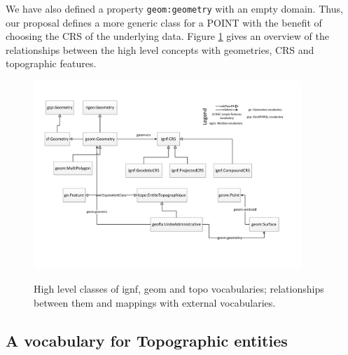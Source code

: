 We have also defined a property \texttt{geom:geometry} with an empty domain. Thus, our proposal defines a more generic class for a \textsf{POINT} with the benefit of choosing the CRS of the underlying data. Figure \ref{fig:geomcrs} gives an overview of the relationships between the high level concepts with geometries, CRS and topographic features.

\begin{figure}[!htbp]
\vspace{-13pt}
  \begin{center}
  \includegraphics[width=0.9\textwidth]{img/vocabs-ign.pdf}
  \vspace{-15pt}
  \caption{High level classes of ignf, geom and topo vocabularies; relationships between them and mappings with external vocabularies.}
  \vspace{-10pt}
  \label{fig:geomcrs}
  \end{center}
\end{figure}

\subsection{A vocabulary for Topographic entities}
\label{sec:topovocab}

